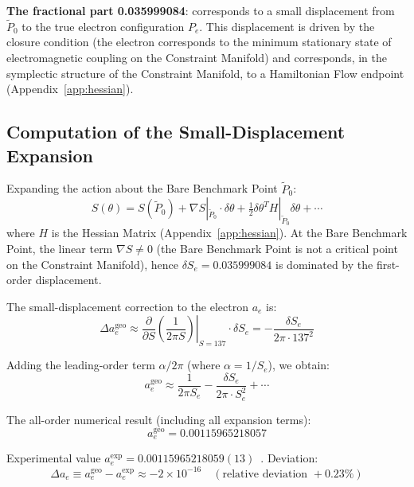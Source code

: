 \documentclass[aps,prd,reprint,nofootinbib]{revtex4-2}
\begin{document}
\textbf{The fractional part 0.035999084}: corresponds to a small displacement from $\tilde{P}_0$ to the true electron configuration $P_e$. This displacement is driven by the closure condition (the electron corresponds to the minimum stationary state of electromagnetic coupling on the Constraint Manifold) and corresponds, in the symplectic structure of the Constraint Manifold, to a Hamiltonian Flow endpoint (Appendix~\ref{app:hessian}).

\subsection{Computation of the Small-Displacement Expansion}

Expanding the action about the Bare Benchmark Point $\tilde{P}_0$:
\begin{equation}
S(\theta) = S(\tilde{P}_0) + \nabla S|_{\tilde{P}_0} \cdot \delta\theta + \tfrac{1}{2}\delta\theta^T H|_{\tilde{P}_0} \delta\theta + \cdots \label{eq:Sexpand}
\end{equation}
where $H$ is the Hessian Matrix (Appendix~\ref{app:hessian}). At the Bare Benchmark Point, the linear term $\nabla S \neq 0$ (the Bare Benchmark Point is not a critical point on the Constraint Manifold), hence $\delta S_e = 0.035999084$ is dominated by the first-order displacement.

The small-displacement correction to the electron $a_e$ is:
\begin{equation}
\Delta a_e^{\text{geo}} \approx \left.\frac{\partial}{\partial S}\left(\frac{1}{2\pi S}\right)\right|_{S=137} \cdot \delta S_e = -\frac{\delta S_e}{2\pi \cdot 137^2} \label{eq:correction}
\end{equation}

Adding the leading-order term $\alpha/2\pi$ (where $\alpha = 1/S_e$), we obtain:
\begin{equation}
a_e^{\text{geo}} \approx \frac{1}{2\pi S_e} - \frac{\delta S_e}{2\pi \cdot S_e^2} + \cdots \label{eq:ae_expanded}
\end{equation}

The all-order numerical result (including all expansion terms):
\begin{equation}
\boxed{a_e^{\text{geo}} = 0.00115965218057} \label{eq:ae_geo}
\end{equation}

Experimental value $a_e^{\text{exp}} = 0.00115965218059(13)$~\cite{Hanneke2008,Fan2023}. Deviation:
\begin{equation}
\Delta a_e \equiv a_e^{\text{geo}} - a_e^{\text{exp}} \approx -2 \times 10^{-16} \quad (\text{relative deviation } +0.23\%) \label{eq:ae_deviation}
\end{equation}
\end{document}
